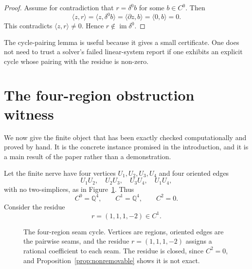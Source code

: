 \documentclass[11pt]{article}
\newcommand{\im}{\operatorname{im}}
\newcommand{\Q}{\mathbb{Q}}
\begin{document}
\begin{proof}
Assume for contradiction that \(r=\delta^0b\) for some \(b\in C^0\). Then
\[
\langle z,r\rangle
=
\langle z,\delta^0b\rangle
=
\langle \partial z,b\rangle
=
\langle 0,b\rangle
=0.
\]
This contradicts \(\langle z,r\rangle\neq 0\). Hence \(r\notin \im\delta^0\).
\end{proof}

The cycle-pairing lemma is useful because it gives a small certificate. One does not need to trust a solver's failed linear-system report if one exhibits an explicit cycle whose pairing with the residue is non-zero.

\section{The four-region obstruction witness}
\label{sec:actual-witness}

We now give the finite object that has been exactly checked computationally and proved by hand. It is the concrete instance promised in the introduction, and it is a main result of the paper rather than a demonstration.

Let the finite nerve have four vertices \(U_1,U_2,U_3,U_4\) and four oriented edges
\[
U_1U_2,\quad U_2U_3,\quad U_3U_4,\quad U_1U_4,
\]
with no two-simplices, as in Figure~\ref{fig:fourcycle}. Thus
\[
C^0=\Q^4,
\qquad
C^1=\Q^4,
\qquad
C^2=0.
\]
Consider the residue
\[
r=(1,1,1,-2)\in C^1.
\]

\begin{figure}[t]
\centering
{}
\caption{The four-region seam cycle. Vertices are regions, oriented edges are the pairwise seams, and the residue \(r=(1,1,1,-2)\) assigns a rational coefficient to each seam. The residue is closed, since \(C^2=0\), and Proposition~\ref{prop:nonremovable} shows it is not exact.}
\label{fig:fourcycle}
\end{figure}
\end{document}

